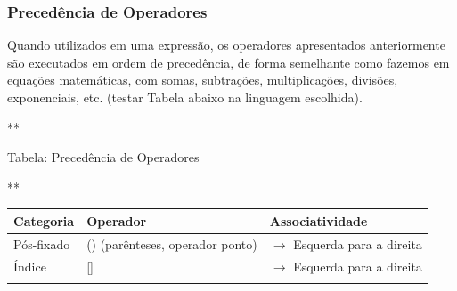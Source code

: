 \documentclass[12pt,a4paper]{article}
\begin{document}
    \hypertarget{preceduxeancia-de-operadores}{%
\subsubsection{Precedência de
Operadores}\label{preceduxeancia-de-operadores}}

    Quando utilizados em uma expressão, os operadores apresentados
anteriormente são executados em ordem de precedência, de forma
semelhante como fazemos em equações matemáticas, com somas, subtrações,
multiplicações, divisões, exponenciais, etc. (testar Tabela abaixo na
linguagem escolhida).

    **

Tabela: Precedência de Operadores

**

\begin{longtable}[]{@{}lll@{}}
\toprule
\begin{minipage}[b]{0.26\columnwidth}\raggedright
Categoria\strut
\end{minipage} & \begin{minipage}[b]{0.44\columnwidth}\raggedright
Operador\strut
\end{minipage} & \begin{minipage}[b]{0.21\columnwidth}\raggedright
Associatividade\strut
\end{minipage}\tabularnewline
\midrule
\endhead
\begin{minipage}[t]{0.26\columnwidth}\raggedright
Pós-fixado\strut
\end{minipage} & \begin{minipage}[t]{0.44\columnwidth}\raggedright
() (parênteses, operador ponto)\strut
\end{minipage} & \begin{minipage}[t]{0.21\columnwidth}\raggedright
\(\rightarrow\) Esquerda para a direita\strut
\end{minipage}\tabularnewline
\begin{minipage}[t]{0.26\columnwidth}\raggedright
Índice\strut
\end{minipage} & \begin{minipage}[t]{0.44\columnwidth}\raggedright
{[}{]}\strut
\end{minipage} & \begin{minipage}[t]{0.21\columnwidth}\raggedright
\(\rightarrow\) Esquerda para a direita\strut
\end{minipage}\tabularnewline
\begin{minipage}[t]{0.26\columnwidth}\raggedright

\end{minipage}
\end{longtable}
\end{document}
